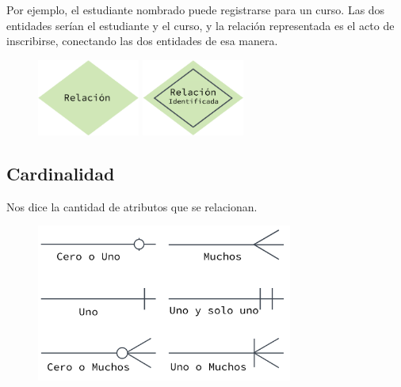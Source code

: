 \documentclass[12pt, fleqn]{report}                             %
\theoremstyle{break}                                            %
\begin{document}
            Por ejemplo, el estudiante nombrado puede registrarse para un curso.
            Las dos entidades serían el estudiante y el curso, y la relación representada es
            el acto de inscribirse, conectando las dos entidades de esa manera. 

            \begin{figure}[h]
                \centering
                \includegraphics[width=0.30\textwidth]{Relacion}
                \includegraphics[width=0.30\textwidth]{RelacionIdentificada}
            \end{figure}


        \subsection{Cardinalidad}

            Nos dice la cantidad de atributos que se relacionan.


            \begin{figure}[h]
                \centering
                \includegraphics[width=0.75\textwidth]{Cardinalidad}
            \end{figure}
\end{document}
